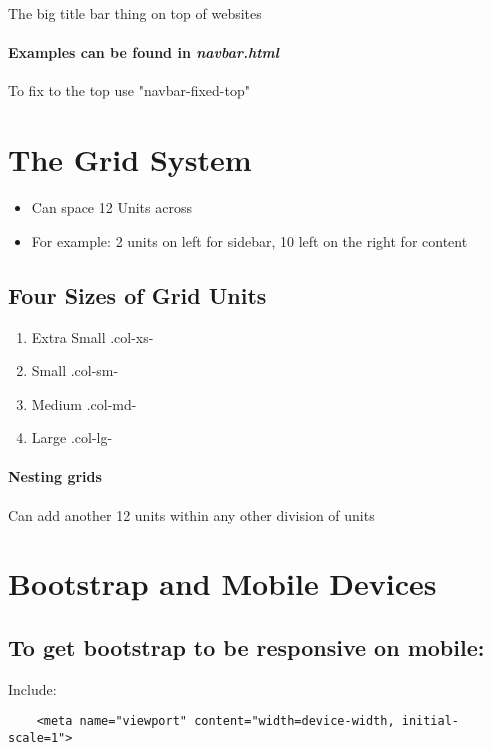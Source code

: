 \documentclass{article}
\begin{document}
	The big title bar thing on top of websites

	\paragraph{Examples can be found in \textit{navbar.html}}
	
	To fix to the top use "navbar-fixed-top"
	
\section{The Grid System}

	\begin{itemize}
		\itemsep0em
		\item Can space 12 Units across
		\item For example: 2 units on left for sidebar, 10 left on the right for content
	\end{itemize}
	
	\subsection*{Four Sizes of Grid Units}
	\begin{enumerate}
	\itemsep0em
	\item Extra Small .col-xs-
	\item Small .col-sm-
	\item Medium .col-md-
	\item Large .col-lg-
	\end{enumerate}

	\paragraph*{Nesting grids} Can add another 12 units within any other division of units


\section{Bootstrap and Mobile Devices}

	\subsection*{To get bootstrap to be responsive on mobile:}
	Include: 
	\begin{verbatim}
	<meta name="viewport" content="width=device-width, initial-scale=1">
	\end{verbatim}
\end{document}
